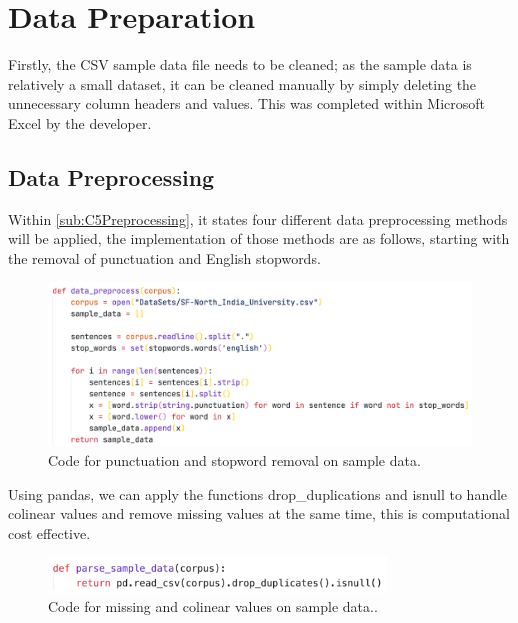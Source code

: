 \section{Data Preparation}

Firstly, the CSV sample data file needs to be cleaned; as the sample data is relatively a small dataset, it can be cleaned manually by simply deleting the unnecessary column headers and values. This was completed within Microsoft Excel by the developer.

\subsection{Data Preprocessing}

Within \autoref{sub:C5Preprocessing}, it states four different data preprocessing methods will be applied, the implementation of those methods are as follows, starting with the removal of punctuation and English stopwords.

\begin{figure}[H]
    \centering
    \includegraphics[width=\textwidth]{figures/chapter-6/data_preprocess.png}
    \caption[Code for punctuation and stopword removal on sample data.]{Code for punctuation and stopword removal on sample data.
    \label{fig:data_pre---processing}}
\end{figure}

\newpage

Using pandas, we can apply the functions drop_duplications and isnull to handle colinear values and remove missing values at the same time, this is computational cost effective.

\begin{figure}[H]
    \centering
    \includegraphics[width=0.8\textwidth]{figures/chapter-6/parse_sample.png}
    \caption[Code for missing and colinear values on sample data.]{Code for missing and colinear values on sample data..
    \label{fig:parse_sample}}
\end{figure}
